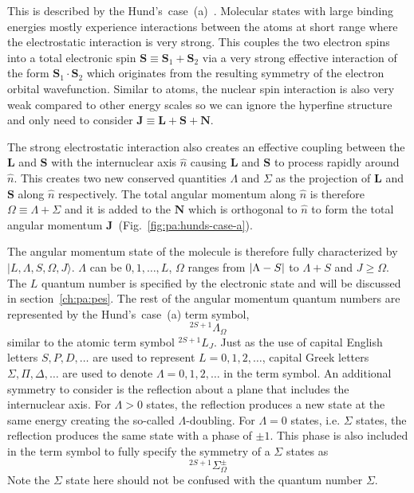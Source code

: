 This is described by the Hund's~case~(a)~\cite[p.~523-626]{bransden_physics_2003}.
Molecular states with large binding energies mostly experience interactions
between the atoms at short range where the electrostatic interaction is very strong.
This couples the two electron spins into a total electronic spin
$\mathbf{S}\equiv\mathbf{S}_1+\mathbf{S}_2$ via a very strong effective interaction
of the form $\mathbf{S}_1\cdot\mathbf{S}_2$ which originates
from the resulting symmetry of the electron orbital wavefunction.
Similar to atoms, the nuclear spin interaction is also very weak compared to
other energy scales so we can ignore the hyperfine structure and only need to consider
$\mathbf{J}\equiv\mathbf{L}+\mathbf{S}+\mathbf{N}$.

The strong electrostatic interaction also creates an effective coupling
between the $\mathbf{L}$ and $\mathbf{S}$ with the internuclear axis $\hat{n}$
causing $\mathbf{L}$ and $\mathbf{S}$ to process rapidly around $\hat{n}$.
This creates two new conserved quantities $\Lambda$ and $\Sigma$
as the projection of $\mathbf{L}$ and $\mathbf{S}$
along $\hat{n}$ respectively.
The total angular momentum along $\hat{n}$ is therefore $\Omega\equiv\Lambda+\Sigma$
and it is added to the $\mathbf{N}$ which is orthogonal to $\hat{n}$ to form
the total angular momentum $\mathbf{J}$~(Fig.~\ref{fig:pa:hunds-case-a}).

The angular momentum state of the molecule is therefore fully characterized by
$|L,\Lambda,S,\Omega,J\rangle$. $\Lambda$ can be $0,1,\dots,L$, $\Omega$ ranges from
${\left|{\Lambda-S}\right|}$ to $\Lambda+S$ and $J\geqslant\Omega$.
The $L$ quantum number is specified by the electronic state and will be discussed
in section~\ref{ch:pa:pes}. The rest of the angular momentum quantum numbers
are represented by the Hund's~case~(a) term symbol,
\[ ^{2S+1}\Lambda_\Omega \]
similar to the atomic term symbol $^{2S+1}L_J$.
Just as the use of capital English letters $S,P,D,\dots$ are used to represent
$L=0,1,2,\dots$, capital Greek letters $\Sigma,\Pi,\Delta,\dots$ are used
to denote $\Lambda=0,1,2,\dots$ in the term symbol.
An additional symmetry to consider is the reflection about a plane that includes
the internuclear axis.
For $\Lambda>0$ states, the reflection produces a new state at the same energy
creating the so-called $\Lambda$-doubling. For $\Lambda=0$ states, i.e. $\Sigma$ states,
the reflection produces the same state with a phase of $\pm1$.
This phase is also included in the term symbol to fully specify the symmetry of
a $\Sigma$ states as
\[ ^{2S+1}\Sigma_\Omega^{\pm} \]
Note the $\Sigma$ state here should not be confused with the quantum number $\Sigma$.

